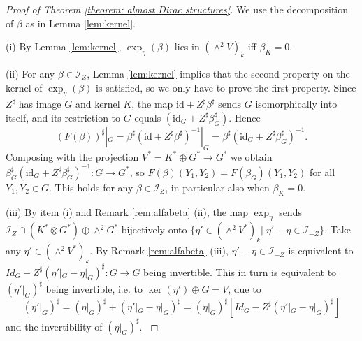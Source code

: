 \documentclass[11pt,thmsa]{amsart}
\theoremstyle{definition}
\newcommand{\id}{\mathrm{id}}
\begin{document}
\begin{proof}[Proof of Theorem \ref{theorem: almost Dirac structures}]
We use the decomposition of $\beta$ as in Lemma \ref{lem:kernel}.

(i) By Lemma \ref{lem:kernel}, $\exp_{\eta}(\beta)$ lies in $(\wedge^2 V)_k$  if{f} $\beta_K=0$.

(ii) For  any $\beta \in \mathcal{I}_Z$,
 Lemma \ref{lem:kernel} implies that the second property on the kernel of $\exp_{\eta}(\beta)$
is satisfied, so we only have to prove the first property.
Since $Z^{\sharp}$ has image $G$ and kernel $K$, the map $\id + Z^{\sharp}\beta^\sharp$ sends $G$ isomorphically into itself, and
 its restriction to $G$ equals $(\id_G + Z^{\sharp}\beta_G^\sharp)$.
Hence $$(F(\beta))^{\sharp}|_G=
 \beta^\sharp(\id + Z^{\sharp}\beta^\sharp)^{-1}|_G=
 \beta^\sharp(\id_G + Z^{\sharp}\beta_G^\sharp)^{-1}.$$
Composing with the projection $V^*=K^*\oplus G^*\to G^*$ we obtain
 $\beta_G^\sharp(\id_G + Z^{\sharp}\beta_G^\sharp)^{-1}\colon G\to G^*$,
 so $F(\beta)(Y_1,Y_2)=F(\beta_G)(Y_1,Y_2)$ for all $Y_1,Y_2\in G$. This holds for  any $\beta \in \mathcal{I}_Z$, in particular also when $\beta_K=0$.

(iii) 
{
By item (i) and Remark \ref{rem:alfabeta}  (ii), the map $\exp_{\eta}$ sends $\mathcal{I}_Z \cap (K^*\otimes G^*)\oplus \wedge^2G^*$ bijectively onto 
$\{\eta' \in (\wedge^2 V^*)_k|\; \eta'-\eta\in \mathcal{I}_{-Z}\}$.
  Take any $\eta'\in (\wedge^2 V^*)_k$.
By Remark \ref{rem:alfabeta} (iii),
$\eta'-\eta\in \mathcal{I}_{-Z}$  is equivalent to $Id_G-Z^{\sharp}
(\eta'|_G-\eta|_G)^\sharp\colon G\to G$ being invertible. This in turn is equivalent to
 $(\eta'|_G)^\sharp$ being invertible, i.e. to $\ker(\eta')\oplus G=V$, due to
$$(\eta'|_G)^\sharp=(\eta|_G)^\sharp+(\eta'|_G-\eta|_G)^\sharp=(\eta|_G)^\sharp[Id_G-Z^{\sharp}
(\eta'|_G-\eta|_G)^\sharp]$$ and the invertibility of $(\eta|_G)^\sharp$.
}
\end{proof}

 
\end{document}
